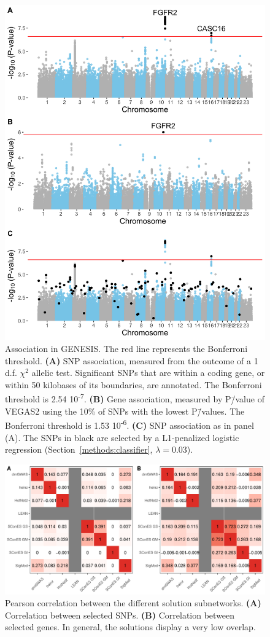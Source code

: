 \documentclass[draft,twocolumn, 11pt]{article}
\begin{document}
\begin{figure}[htbp]
  \centering
  \includegraphics[width=.7\linewidth]{./figures/sfigure_2.png}
  \caption{Association in GENESIS. The red line represents the Bonferroni threshold. \textbf{(A)} SNP association, measured from the outcome of a 1 d.f. $\chi^2$ allelic test. Significant SNPs that are within a coding gene, or within 50 kilobases of its boundaries, are annotated. The Bonferroni threshold is 2.54 \texttimes{} 10\textsuperscript{-7}. \textbf{(B)} Gene association, measured by P\=/value of VEGAS2 \cite{mishra_vegas2:_2015} using the 10\% of SNPs with the lowest P\=/values. The Bonferroni threshold is 1.53 \texttimes{} 10\textsuperscript{-6}. \textbf{(C)} SNP association as in panel (A). The SNPs in black are selected by a L1-penalized logistic regression (Section~\ref{methods:classifier}, $\lambda = 0.03$).}
  \label{sfig:snp_gene_manhattan}
\end{figure}

\begin{figure}[htbp]
\centering
\includegraphics[width=.9\linewidth]{./figures/sfigure_3.pdf}
\caption{Pearson correlation between the different solution subnetworks. \textbf{(A)} Correlation between selected SNPs. \textbf{(B)} Correlation between selected genes. In general, the solutions display a very low overlap.}
\label{sfig:pearson_methods}
\end{figure}
\end{document}
